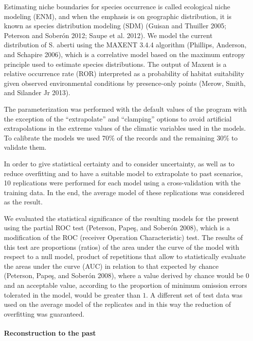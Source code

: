 \documentclass[
]{article}
\begin{document}
Estimating niche boundaries for species occurrence is called ecological
niche modeling (ENM), and when the emphasis is on geographic
distribution, it is known as species distribution modeling (SDM) (Guisan
and Thuiller 2005; Peterson and Soberón 2012; Saupe et al. 2012). We
model the current distribution of S. aberti using the MAXENT 3.4.4
algorithm (Phillips, Anderson, and Schapire 2006), which is a
correlative model based on the maximum entropy principle used to
estimate species distributions. The output of Maxent is a relative
occurrence rate (ROR) interpreted as a probability of habitat
suitability given observed environmental conditions by presence-only
points (Merow, Smith, and Silander Jr 2013).

The parameterization was performed with the default values of the
program with the exception of the ``extrapolate'' and ``clamping''
options to avoid artificial extrapolations in the extreme values of the
climatic variables used in the models. To calibrate the models we used
70\% of the records and the remaining 30\% to validate them.

In order to give statistical certainty and to consider uncertainty, as
well as to reduce overfitting and to have a suitable model to
extrapolate to past scenarios, 10 replications were performed for each
model using a cross-validation with the training data. In the end, the
average model of these replications was considered as the result.

We evaluated the statistical significance of the resulting models for
the present using the partial ROC test (Peterson, Papeş, and Soberón
2008), which is a modification of the ROC (receiver Operation
Characteristic) test. The results of this test are proportions (ratios)
of the area under the curve of the model with respect to a null model,
product of repetitions that allow to statistically evaluate the areas
under the curve (AUC) in relation to that expected by chance (Peterson,
Papeş, and Soberón 2008), where a value derived by chance would be \(0\)
and an acceptable value, according to the proportion of minimum omission
errors tolerated in the model, would be greater than \(1\). A different
set of test data was used on the average model of the replicates and in
this way the reduction of overfitting was guaranteed.

\hypertarget{reconstruction-to-the-past}{%
\paragraph{Reconstruction to the
past}\label{reconstruction-to-the-past}}
\end{document}
